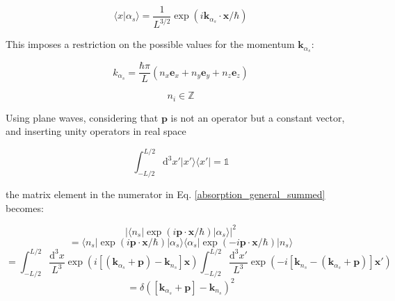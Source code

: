 \documentclass{article}
\begin{document}
\begin{equation}
\label{plane_wave_normalized}
	\langle x | \alpha_s \rangle = \frac{1}{L^{ 3/2}} \exp{ \left( i \mathbf{k}_{\alpha_s} \cdot \mathbf{x} / \hbar \right) }
\end{equation}

This imposes a restriction on the possible values for the momentum $\mathbf{k}_{\alpha_s}$:

\begin{equation}
	\label{k_quantization}
	k_{\alpha_s} = \frac{\hbar \pi}{L} \left( n_x \mathbf{e}_x + n_y \mathbf{e}_y + n_z \mathbf{e}_z \right)
\end{equation}

\begin{equation*}
	n_i \in \mathbb{Z}
\end{equation*}

Using plane waves, considering that $\mathbf{p}$ is not an operator but a constant vector, and inserting unity operators in real space

\begin{equation}
	\int_{-L/2}^{L/2} \mathrm{d}^3 x' \left| x' \rangle \langle x' \right| = \mathbb{1}
\end{equation}

the matrix element in the numerator in Eq. \ref{absorption_general_summed} becomes:

\begin{equation}
	\label{plane_wave_delta}
	\left| \langle n_s | \exp{\left( i \mathbf{p} \cdot \mathbf{x} / \hbar \right)} | \alpha_s \rangle \right|^2 
\end{equation}
\begin{equation*}
	= \langle n_s | \exp{\left( i \mathbf{p} \cdot \mathbf{x} / \hbar \right)} | \alpha_s \rangle \langle \alpha_s | \exp{\left( -i \mathbf{p} \cdot \mathbf{x} / \hbar \right)} | n_s \rangle
\end{equation*}
\begin{equation*}
	= \int_{-L/2}^{L/2} \frac{\mathrm{d}^3 x}{L^3} \exp{ \left( i \left[ \left( \mathbf{k}_{\alpha_s} + \mathbf{p} \right) - \mathbf{k}_{n_s} \right] \mathbf{x} \right) } \int_{-L/2}^{L/2}\frac{\mathrm{d}^3 x'}{L^3} \exp{ \left( - i \left[ \mathbf{k}_{n_s} - \left( \mathbf{k}_{\alpha_s} + \mathbf{p} \right) \right] \mathbf{x}' \right) }
\end{equation*}
\begin{equation*}
	= \delta \left( \left[ \mathbf{k}_{\alpha_s} + \mathbf{p} \right] - \mathbf{k}_{n_s} \right)^2
\end{equation*}
\end{document}
